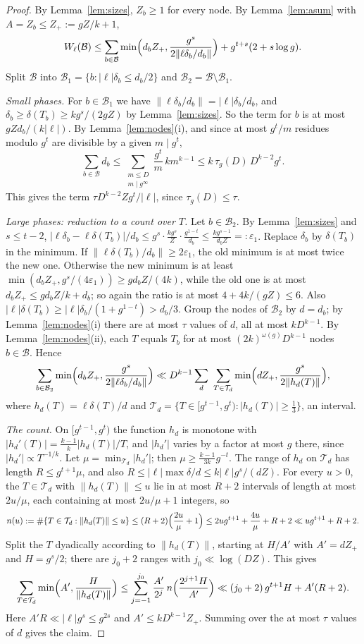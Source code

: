 \documentclass[11pt]{amsart}
\theoremstyle{definition}
\numberwithin{equation}{section}
\newcommand{\cB}{\mathcal{B}}
\newcommand{\cT}{\mathcal{T}}
\begin{document}
\begin{proof}
By Lemma~\ref{lem:sizes}, $Z_b\ge1$ for every node. By Lemma~\ref{lem:asum}
with $A=Z_b\le Z_+:=gZ/k+1$,
\[
W_\ell(\cB)\le\sum_{b\in\cB}\min\Bigl(d_bZ_+,\frac{g^s}{2\|\ell\delta_b/d_b\|}\Bigr)+g^{t+s}(2+s\log g).
\]
Split $\cB$ into $\cB_1=\{b:|\ell|\delta_b\le d_b/2\}$ and
$\cB_2=\cB\setminus\cB_1$.

\emph{Small phases.} For $b\in\cB_1$ we have
$\|\ell\delta_b/d_b\|=|\ell|\delta_b/d_b$, and $\delta_b\ge\delta(T_b)\ge
kg^s/(2gZ)$ by Lemma~\ref{lem:sizes}. So the term for $b$ is at most
$gZd_b/(k|\ell|)$. By Lemma~\ref{lem:nodes}(i), and since at most $g^t/m$
residues modulo $g^t$ are divisible by a given $m\mid g^t$,
\[
\sum_{b\in\cB}d_b\le\sum_{\substack{m\le D\\ m\mid g^\infty}}\frac{g^t}m\,km^{k-1}\le k\,\tau_g(D)\,D^{k-2}g^t .
\]
This gives the term $\tau D^{k-2}Zg^t/|\ell|$, since $\tau_g(D)\le\tau$.

\emph{Large phases: reduction to a count over $T$.} Let $b\in\cB_2$. By
Lemma~\ref{lem:sizes} and $s\le t-2$,
$|\ell\delta_b-\ell\delta(T_b)|/d_b\le g^s\cdot\frac{kg^s}Z\cdot\frac{g^{1-t}}{d_b}\le\frac{kg^{s-1}}{d_bZ}=:\varepsilon_1$.
Replace $\delta_b$ by $\delta(T_b)$ in the minimum. If
$\|\ell\delta(T_b)/d_b\|\ge2\varepsilon_1$, the old minimum is at most twice the
new one. Otherwise the new minimum is at least
$\min(d_bZ_+,g^s/(4\varepsilon_1))\ge gd_bZ/(4k)$, while the old one
is at most $d_bZ_+\le gd_bZ/k+d_b$; so again the ratio is at most
$4+4k/(gZ)\le6$. Also
$|\ell|\delta(T_b)\ge|\ell|\delta_b/(1+g^{1-t})>d_b/3$. Group the nodes of
$\cB_2$ by $d=d_b$; by Lemma~\ref{lem:nodes}(i) there are at most $\tau$
values of $d$, all at most $kD^{k-1}$. By Lemma~\ref{lem:nodes}(ii), each
$T$ equals $T_b$ for at most $(2k)^{\omega(g)}D^{k-1}$ nodes $b\in\cB$.
Hence
\[
\sum_{b\in\cB_2}\min\Bigl(d_bZ_+,\frac{g^s}{2\|\ell\delta_b/d_b\|}\Bigr)
\ll D^{k-1}\sum_{d}\ \sum_{T\in\cT_d}\min\Bigl(dZ_+,\frac{g^s}{2\|h_d(T)\|}\Bigr),
\]
where $h_d(T)=\ell\delta(T)/d$ and
$\cT_d=\{T\in[g^{t-1},g^t):|h_d(T)|\ge\frac13\}$, an interval.

\emph{The count.} On $[g^{t-1},g^t)$ the function $h_d$ is monotone with
$|h_d'(T)|=\frac{k-1}k|h_d(T)|/T$, and $|h_d'|$ varies by a factor at most
$g$ there, since $|h_d'|\propto T^{-1/k}$. Let $\mu=\min_{\cT_d}|h_d'|$; then
$\mu\ge\frac{k-1}{3k}g^{-t}$. The range of $h_d$ on $\cT_d$ has length
$R\le g^{t+1}\mu$, and also $R\le|\ell|\max\delta/d\le k|\ell|g^s/(dZ)$. For
every $u>0$, the $T\in\cT_d$ with $\|h_d(T)\|\le u$ lie in at most $R+2$
intervals of length at most $2u/\mu$, each containing at most $2u/\mu+1$
integers, so
\[
n(u):=\#\{T\in\cT_d:\|h_d(T)\|\le u\}\le(R+2)\Bigl(\frac{2u}\mu+1\Bigr)\le2ug^{t+1}+\frac{4u}\mu+R+2\ll ug^{t+1}+R+2.
\]
Split the $T$ dyadically according to $\|h_d(T)\|$, starting at $H/A'$ with
$A'=dZ_+$ and $H=g^s/2$; there are $j_0+2$ ranges with $j_0\ll\log(DZ)$. This
gives
\[
\sum_{T\in\cT_d}\min\Bigl(A',\frac H{\|h_d(T)\|}\Bigr)\le\sum_{j=-1}^{j_0}\frac{A'}{2^j}\,n\Bigl(\frac{2^{j+1}H}{A'}\Bigr)
\ll(j_0+2)\,g^{t+1}H+A'(R+2).
\]
Here $A'R\ll|\ell|g^s\le g^{2s}$ and $A'\le kD^{k-1}Z_+$. Summing over the
at most $\tau$ values of $d$ gives the claim.
\end{proof}
\end{document}
